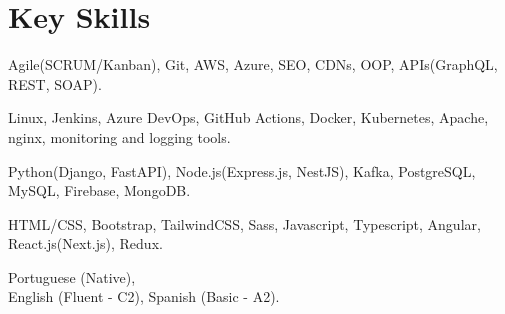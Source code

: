 \section{Key Skills}
{Agile(SCRUM/Kanban), Git, AWS, Azure, SEO, CDNs, OOP, APIs(GraphQL, REST, SOAP).}

{Linux, Jenkins, Azure DevOps, GitHub Actions, Docker, Kubernetes, Apache, nginx, monitoring and logging tools.}

{Python(Django, FastAPI), Node.js(Express.js, NestJS), Kafka, PostgreSQL, MySQL, Firebase, MongoDB.}

{HTML/CSS, Bootstrap, TailwindCSS, Sass, Javascript, Typescript, Angular, React.js(Next.js), Redux.}

{Portuguese (Native), \\ English (Fluent - C2), Spanish (Basic - A2).}
